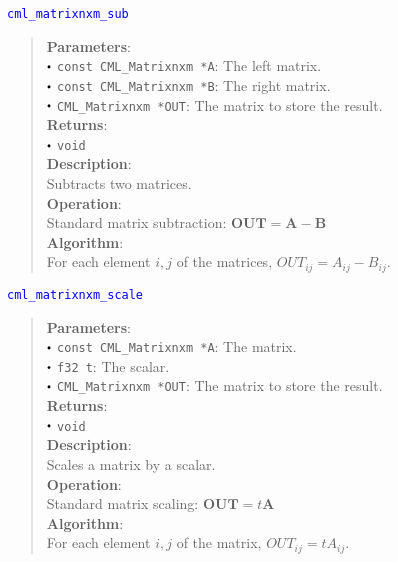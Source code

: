\documentclass[a4paper,oneside,8pt]{extarticle}
\newcommand{\function}[1]{
  \noindent\textcolor{blue}{\texttt{#1}}
  \vspace{-0.3em}
}
\renewcommand{\dot}{\raisebox{0.3ex}{\scalebox{0.6}{$\bullet$}}}
\theoremstyle{definition}
\begin{document}
\function{cml\_matrixnxm\_sub}
\begin{quote}
  \textbf{Parameters}: \\
  $\dot$ \texttt{const CML\_Matrixnxm *A}: The left matrix. \\
  $\dot$ \texttt{const CML\_Matrixnxm *B}: The right matrix. \\
  $\dot$ \texttt{CML\_Matrixnxm *OUT}: The matrix to store the result. \\
  \textbf{Returns}: \\
  $\dot$ \texttt{void} \\

  \vspace{-0.75em}
  \textbf{Description}: \\
  Subtracts two matrices. \\

  \vspace{-0.75em}
  \textbf{Operation}: \\
  Standard matrix subtraction: $\mathbf{OUT} = \mathbf{A} - \mathbf{B}$ \\

  \vspace{-0.75em}
  \textbf{Algorithm}: \\
  For each element $i, j$ of the matrices, $OUT_{ij} = A_{ij} - B_{ij}$. \\
\end{quote}

\function{cml\_matrixnxm\_scale}
\begin{quote}
  \textbf{Parameters}: \\
  $\dot$ \texttt{const CML\_Matrixnxm *A}: The matrix. \\
  $\dot$ \texttt{f32 t}: The scalar. \\
  $\dot$ \texttt{CML\_Matrixnxm *OUT}: The matrix to store the result. \\
  \textbf{Returns}: \\
  $\dot$ \texttt{void} \\

  \vspace{-0.75em}
  \textbf{Description}: \\
  Scales a matrix by a scalar. \\

  \vspace{-0.75em}
  \textbf{Operation}: \\
  Standard matrix scaling: $\mathbf{OUT} = t\mathbf{A}$ \\

  \vspace{-0.75em}
  \textbf{Algorithm}: \\
  For each element $i, j$ of the matrix, $OUT_{ij} = tA_{ij}$. \\
\end{quote}
\end{document}
